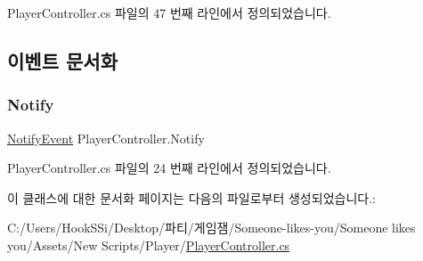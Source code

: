 Player\+Controller.\+cs 파일의 47 번째 라인에서 정의되었습니다.



\subsection{이벤트 문서화}
\mbox{\label{class_player_controller_af13292e01756741118500035511fc88d}} 
\subsubsection{\texorpdfstring{Notify}{Notify}}
{\footnotesize\ttfamily \mbox{\hyperlink{class_player_controller_a934c7f80b80276620cd60eaaeea7520e}{Notify\+Event}} Player\+Controller.\+Notify\hspace{0.3cm}{\ttfamily [static]}}



Player\+Controller.\+cs 파일의 24 번째 라인에서 정의되었습니다.



이 클래스에 대한 문서화 페이지는 다음의 파일로부터 생성되었습니다.\+:\begin{DoxyCompactItemize}
\item 
C\+:/\+Users/\+Hook\+S\+Si/\+Desktop/파티/게임잼/\+Someone-\/likes-\/you/\+Someone likes you/\+Assets/\+New Scripts/\+Player/\mbox{\hyperlink{_player_controller_8cs}{Player\+Controller.\+cs}}\end{DoxyCompactItemize}
